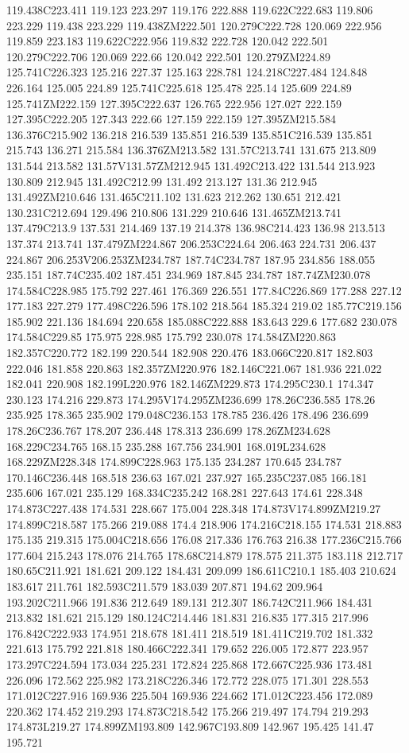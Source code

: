 119.438C223.411 119.123 223.297 119.176 222.888 119.622C222.683 119.806 223.229 119.438 223.229 119.438ZM222.501 120.279C222.728 120.069 222.956 119.859 223.183 119.622C222.956 119.832 222.728 120.042 222.501 120.279C222.706 120.069 222.66 120.042 222.501 120.279ZM224.89 125.741C226.323 125.216 227.37 125.163 228.781 124.218C227.484 124.848 226.164 125.005 224.89 125.741C225.618 125.478 225.14 125.609 224.89 125.741ZM222.159 127.395C222.637 126.765 222.956 127.027 222.159 127.395C222.205 127.343 222.66 127.159 222.159 127.395ZM215.584 136.376C215.902 136.218 216.539 135.851 216.539 135.851C216.539 135.851 215.743 136.271 215.584 136.376ZM213.582 131.57C213.741 131.675 213.809 131.544 213.582 131.57V131.57ZM212.945 131.492C213.422 131.544 213.923 130.809 212.945 131.492C212.99 131.492 213.127 131.36 212.945 131.492ZM210.646 131.465C211.102 131.623 212.262 130.651 212.421 130.231C212.694 129.496 210.806 131.229 210.646 131.465ZM213.741 137.479C213.9 137.531 214.469 137.19 214.378 136.98C214.423 136.98 213.513 137.374 213.741 137.479ZM224.867 206.253C224.64 206.463 224.731 206.437 224.867 206.253V206.253ZM234.787 187.74C234.787 187.95 234.856 188.055 235.151 187.74C235.402 187.451 234.969 187.845 234.787 187.74ZM230.078 174.584C228.985 175.792 227.461 176.369 226.551 177.84C226.869 177.288 227.12 177.183 227.279 177.498C226.596 178.102 218.564 185.324 219.02 185.77C219.156 185.902 221.136 184.694 220.658 185.088C222.888 183.643 229.6 177.682 230.078 174.584C229.85 175.975 228.985 175.792 230.078 174.584ZM220.863 182.357C220.772 182.199 220.544 182.908 220.476 183.066C220.817 182.803 222.046 181.858 220.863 182.357ZM220.976 182.146C221.067 181.936 221.022 182.041 220.908 182.199L220.976 182.146ZM229.873 174.295C230.1 174.347 230.123 174.216 229.873 174.295V174.295ZM236.699 178.26C236.585 178.26 235.925 178.365 235.902 179.048C236.153 178.785 236.426 178.496 236.699 178.26C236.767 178.207 236.448 178.313 236.699 178.26ZM234.628 168.229C234.765 168.15 235.288 167.756 234.901 168.019L234.628 168.229ZM228.348 174.899C228.963 175.135 234.287 170.645 234.787 170.146C236.448 168.518 236.63 167.021 237.927 165.235C237.085 166.181 235.606 167.021 235.129 168.334C235.242 168.281 227.643 174.61 228.348 174.873C227.438 174.531 228.667 175.004 228.348 174.873V174.899ZM219.27 174.899C218.587 175.266 219.088 174.4 218.906 174.216C218.155 174.531 218.883 175.135 219.315 175.004C218.656 176.08 217.336 176.763 216.38 177.236C215.766 177.604 215.243 178.076 214.765 178.68C214.879 178.575 211.375 183.118 212.717 180.65C211.921 181.621 209.122 184.431 209.099 186.611C210.1 185.403 210.624 183.617 211.761 182.593C211.579 183.039 207.871 194.62 209.964 193.202C211.966 191.836 212.649 189.131 212.307 186.742C211.966 184.431 213.832 181.621 215.129 180.124C214.446 181.831 216.835 177.315 217.996 176.842C222.933 174.951 218.678 181.411 218.519 181.411C219.702 181.332 221.613 175.792 221.818 180.466C222.341 179.652 226.005 172.877 223.957 173.297C224.594 173.034 225.231 172.824 225.868 172.667C225.936 173.481 226.096 172.562 225.982 173.218C226.346 172.772 228.075 171.301 228.553 171.012C227.916 169.936 225.504 169.936 224.662 171.012C223.456 172.089 220.362 174.452 219.293 174.873C218.542 175.266 219.497 174.794 219.293 174.873L219.27 174.899ZM193.809 142.967C193.809 142.967 195.425 141.47 195.721 